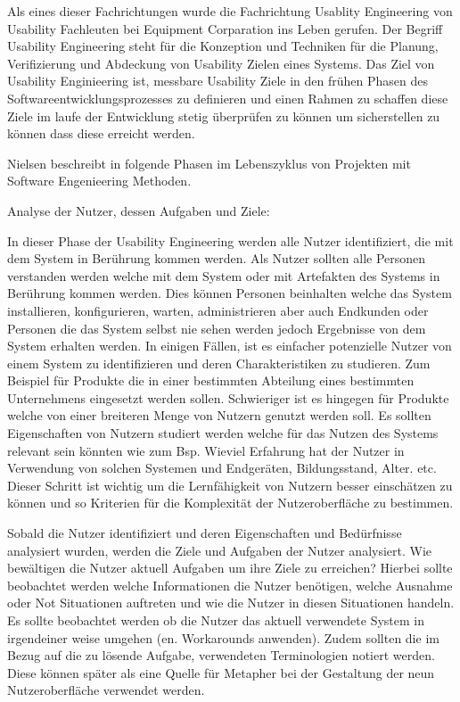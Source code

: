 \cite{MaryBethRossonJohnM.CarrollDianeD.Cerra2002} Als eines dieser Fachrichtungen wurde die Fachrichtung Usablity Engineering von Usability Fachleuten bei Equipment Corparation ins Leben gerufen.  
Der Begriff Usability Engineering steht für die Konzeption und Techniken für die Planung, Verifizierung und Abdeckung von Usability Zielen eines Systems. Das Ziel von Usability Enginieering ist, 
messbare Usability Ziele in den frühen Phasen des Softwareentwicklungsprozesses zu definieren und einen Rahmen zu schaffen diese Ziele im laufe der Entwicklung stetig überprüfen zu können 
um sicherstellen zu können dass diese erreicht werden.

Nielsen beschreibt in \cite{Nielsen1994} folgende Phasen im Lebenszyklus von Projekten mit Software Engenieering Methoden.

Analyse der Nutzer, dessen Aufgaben und Ziele:  

In dieser Phase der Usability Engineering werden alle Nutzer identifiziert, die mit dem System in Berührung kommen werden. Als Nutzer sollten alle Personen verstanden werden welche mit dem 
System oder mit Artefakten des Systems in Berührung kommen werden. Dies können Personen beinhalten welche das System installieren, konfigurieren, warten, administrieren aber auch Endkunden oder 
Personen die das System selbst nie sehen werden jedoch Ergebnisse von dem System erhalten werden. In einigen Fällen, ist es einfacher potenzielle Nutzer von einem System zu identifizieren und deren 
Charakteristiken zu studieren. Zum Beispiel für Produkte die in einer bestimmten Abteilung eines bestimmten Unternehmens eingesetzt werden sollen. Schwieriger ist es hingegen für Produkte 
welche von einer breiteren Menge von Nutzern genutzt werden soll. Es sollten Eigenschaften von Nutzern studiert werden welche für das Nutzen des Systems relevant sein könnten wie zum Bsp. 
Wieviel Erfahrung  hat der Nutzer in Verwendung von solchen Systemen und Endgeräten, Bildungsstand, Alter. etc. Dieser Schritt ist wichtig um die Lernfähigkeit von Nutzern besser einschätzen zu 
können und so Kriterien für die Komplexität der Nutzeroberfläche zu bestimmen.

Sobald die Nutzer identifiziert und deren Eigenschaften und Bedürfnisse analysiert wurden, werden die Ziele und Aufgaben der Nutzer analysiert. Wie bewältigen die Nutzer aktuell Aufgaben um 
ihre Ziele zu erreichen? Hierbei sollte beobachtet werden welche Informationen die Nutzer benötigen, welche Ausnahme oder Not Situationen  auftreten und wie die Nutzer in diesen Situationen handeln. 
Es sollte beobachtet werden ob die Nutzer das aktuell verwendete System in irgendeiner weise umgehen (en. Workarounds anwenden). Zudem sollten die im Bezug auf die zu lösende Aufgabe, verwendeten 
Terminologien notiert werden. Diese können später als eine Quelle für Metapher bei der Gestaltung der neun Nutzeroberfläche verwendet werden. 

